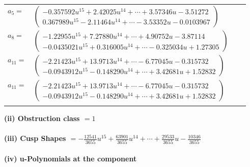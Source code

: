 \documentclass[1p]{elsarticle_modified}
\theoremstyle{definition}
\begin{document}
\begin{tabular}{m{7pt} m{180pt} m{7pt} m{180pt} }
\flushright $a_{5}=$&$\begin{pmatrix}-0.357592 u^{15}+2.42025 u^{14}+\cdots+3.57346 u-3.51272\\0.367989 u^{15}-2.11464 u^{14}+\cdots-3.53352 u-0.0103967\end{pmatrix}$ \\
\flushright $a_{8}=$&$\begin{pmatrix}-1.22955 u^{15}+7.27880 u^{14}+\cdots+4.90752 u-3.87114\\-0.0435021 u^{15}+0.316005 u^{14}+\cdots-0.325034 u+1.27305\end{pmatrix}$ \\
\flushright $a_{11}=$&$\begin{pmatrix}-2.21423 u^{15}+13.9713 u^{14}+\cdots-6.77045 u-0.315732\\-0.0943912 u^{15}-0.148290 u^{14}+\cdots+3.42681 u+1.52832\end{pmatrix}$\\ \flushright $a_{11}=$&$\begin{pmatrix}-2.21423 u^{15}+13.9713 u^{14}+\cdots-6.77045 u-0.315732\\-0.0943912 u^{15}-0.148290 u^{14}+\cdots+3.42681 u+1.52832\end{pmatrix}$\\&\end{tabular}
\flushleft \textbf{(ii) Obstruction class $= 1$}\\~\\
\flushleft \textbf{(iii) Cusp Shapes $= -\frac{12541}{3655} u^{15}+\frac{63901}{3655} u^{14}+\cdots+\frac{29533}{3655} u-\frac{10346}{3655}$}\\~\\
\newpage\renewcommand{\arraystretch}{1}
\flushleft \textbf{(iv) u-Polynomials at the component}\newline \\
\end{document}
